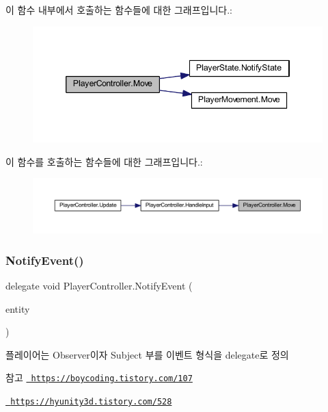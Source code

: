 이 함수 내부에서 호출하는 함수들에 대한 그래프입니다.\+:
\nopagebreak
\begin{figure}[H]
\begin{center}
\leavevmode
\includegraphics[width=346pt]{dc/dde/class_player_controller_a74676e263dd0a0a9a03a389fa9758bd6_cgraph}
\end{center}
\end{figure}
이 함수를 호출하는 함수들에 대한 그래프입니다.\+:
\nopagebreak
\begin{figure}[H]
\begin{center}
\leavevmode
\includegraphics[width=350pt]{dc/dde/class_player_controller_a74676e263dd0a0a9a03a389fa9758bd6_icgraph}
\end{center}
\end{figure}
\mbox{\label{class_player_controller_a934c7f80b80276620cd60eaaeea7520e}} 
\subsubsection{\texorpdfstring{NotifyEvent()}{NotifyEvent()}}
{\footnotesize\ttfamily delegate void Player\+Controller.\+Notify\+Event (\begin{DoxyParamCaption}\item[{Game\+Object}]{entity }\end{DoxyParamCaption})}



플레이어는 Observer이자 Subject 부를 이벤트 형식을 delegate로 정의 

\begin{DoxySeeAlso}{참고}
\href{https://boycoding.tistory.com/107}{\texttt{ https\+://boycoding.\+tistory.\+com/107}} 

\href{https://hyunity3d.tistory.com/528}{\texttt{ https\+://hyunity3d.\+tistory.\+com/528}} 
\end{DoxySeeAlso}
\mbox{\label{class_player_controller_ae8bc83dffb99867a04be016473ed2c43}} 
